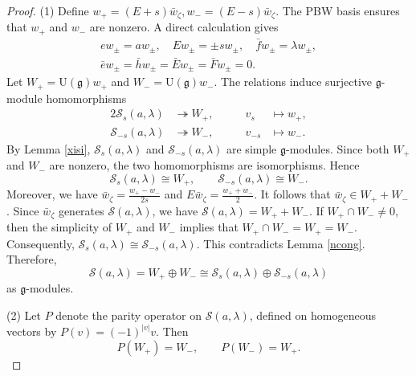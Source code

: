 \documentclass[a4paper,10pt]{article}
\theoremstyle{definition}
\theoremstyle{plain}
\theoremstyle{remark}
\theoremstyle{mystyle}
\numberwithin{equation}{section}
\begin{document}
\begin{proof}
   (1) Define $w_+=(E+s)\bar w_{\zeta},w_-=(E-s)\bar w_{\zeta}$. The PBW basis ensures that \(w_+\) and \(w_-\) are nonzero. A direct calculation gives
    \begin{equation}\label{pm}
        \begin{gathered}
        ew_\pm=aw_\pm,\quad
        Ew_\pm=\pm sw_\pm,\quad  \bar fw_\pm=\lambda w_\pm,\\
        \bar ew_\pm=\bar hw_\pm
        =\bar Ew_\pm=\bar Fw_\pm=0.
        \end{gathered}
    \end{equation}
    Let $W_+=\mathrm U(\mathfrak g)w_+$ and $W_-=\mathrm U(\mathfrak g)w_-$. The relations induce surjective $\mathfrak g$-module homomorphisms
    \begin{alignat*}{2}
        \mathcal {S}_{s}(a,\lambda) &\twoheadrightarrow W_+, \qquad& v_s &\mapsto w_+, \\
        \mathcal {S}_{-s}(a,\lambda) &\twoheadrightarrow W_-, \qquad& v_{-s} &\mapsto w_-.
    \end{alignat*}
    By Lemma \ref{xisi}, $\mathcal {S}_{s}(a,\lambda)$ and $\mathcal {S}_{-s}(a,\lambda)$ are simple $\mathfrak g$-modules. Since both $W_+$ and $W_-$ are nonzero, the two homomorphisms are isomorphisms. Hence
    \begin{equation}\label{lw}
    \mathcal {S}_{s}(a,\lambda)\cong W_+,
    \qquad
    \mathcal {S}_{-s}(a,\lambda)\cong  W_-.
    \end{equation}
    Moreover, we have $\bar w_{\zeta }=\frac{w_+-w_-}{2s}$ and $E\bar w_{\zeta}=\frac{w_++w_-}{2}$. It follows that $\bar w_{\zeta}\in W_++W_-$. Since \(\bar w_{\zeta}\) generates \(\mathcal {S}(a,\lambda)\), we have $\mathcal {S}(a,\lambda)=W_++W_-$. If \(W_+\cap W_-\neq0\), then the simplicity of $W_+$ and $W_-$ implies that $W_+\cap W_-=W_+=W_-$. Consequently, $\mathcal {S}_{s}(a,\lambda)\cong \mathcal {S}_{-s}(a,\lambda)$. This contradicts Lemma \ref{ncong}. Therefore,
    \begin{equation}\label{op}
        \mathcal {S}(a,\lambda)=W_+\oplus  W_-\cong \mathcal {S}_{s}(a,\lambda)\oplus  \mathcal {S}_{-s}(a,\lambda)
    \end{equation}
    as $\mathfrak g$-modules.
    
    (2) Let \(P\) denote the parity operator on \(\mathcal {S}(a,\lambda)\), defined on homogeneous vectors by \(P(v)=(-1)^{|v|}v\). Then
    \begin{equation}\label{change}
        P(W_+)=W_-,\qquad P(W_-)=W_+.       
    \end{equation}


\end{proof}
\end{document}
